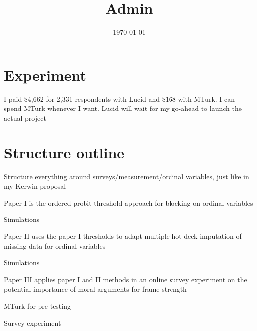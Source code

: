 

\title{Admin}

\date{\today}



\maketitle


\section*{Experiment}
	\begin{coi}
		\item I paid \$4,662 for 2,331 respondents with Lucid and \$168 with MTurk. I can spend MTurk whenever I want. Lucid will wait for my go-ahead to launch the actual project
	\end{coi}	
	
	
	
\section*{Structure outline}
	\begin{coi}
		\item Structure everything around surveys/measurement/ordinal variables, just like in my Kerwin proposal
		\item Paper I is the ordered probit threshold approach for blocking on ordinal variables
			\begin{coi}
				\item Simulations
			\end{coi}
		\item Paper II uses the paper I thresholds to adapt multiple hot deck imputation of missing data for ordinal variables
			\begin{coi}
				\item Simulations
			\end{coi}
		\item Paper III applies paper I and II methods in an online survey experiment on the potential importance of moral arguments for frame strength
			\begin{coi}
				\item MTurk for pre-testing
				\item Survey experiment
			\end{coi}
	\end{coi}


